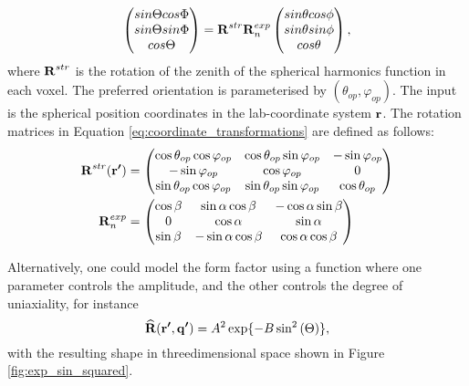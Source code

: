 \begin{equation}\label{eq:coordinate_transformations}
    \begin{pmatrix}
        sin \Theta cos \Phi \\
        sin \Theta sin \Phi \\
        cos \Theta
    \end{pmatrix}
    = \bm{\mathrm{R}}^{str} \bm{\mathrm{R}}_{n}^{exp}
    \begin{pmatrix}
        sin \theta cos \phi \\
        sin \theta sin \phi \\
        cos \theta
    \end{pmatrix},
\end{equation}
\noindent
where $\bm{\mathrm{R}}^{str}$ is the rotation of the zenith of the spherical harmonics function in each voxel. The preferred orientation is parameterised by $(\theta_{op}, \varphi_{op})$.
The input is the spherical position coordinates in the lab-coordinate system $\bm{\mathrm{r}}$.
The rotation matrices in Equation \eqref{eq:coordinate_transformations} are defined as follows:
\begin{equation}
    \begin{split}
        \bm{\mathrm{R}}^{str}(\bm{\mathrm{r'}}) &=
        \begin{pmatrix}
            \cos\theta_{op} \cos\varphi_{op} & \cos\theta_{op} \sin\varphi_{op} & -\sin\varphi_{op}  \\
            -\sin\varphi_{op}            & \cos\varphi_{op}             & 0           \\
            \sin\theta_{op} \cos\varphi_{op} & \sin\theta_{op} \sin\varphi_{op} & \cos\theta_{op}
        \end{pmatrix}\\
        \bm{\mathrm{R}}_{n}^{exp} &=
        \begin{pmatrix}
            \cos \beta & \sin \alpha \cos \beta & -\cos\alpha \sin\beta \\
            0          & \cos \alpha            & \sin \alpha           \\
            \sin\beta  & - \sin\alpha \cos\beta & \cos\alpha \cos\beta
        \end{pmatrix}
    \end{split}
\end{equation}

Alternatively, one could model the form factor using a function where one parameter controls the amplitude, and the other controls the degree of uniaxiality, for instance
\begin{equation}\label{eq:exp_sin_squared}
    \bm{\mathrm{\widehat{R}}}(\bm{\mathrm{r'}}, \bm{\mathrm{q'}}) = A^{2} \exp\{-B \sin^{2}\left( \Theta\right) \},
\end{equation}
with the resulting shape in threedimensional space shown in Figure \ref{fig:exp_sin_squared}.

